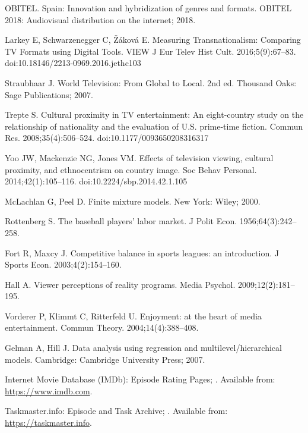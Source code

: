\documentclass[10pt,letterpaper]{article}
\begin{document}
\begin{thebibliography}{22}
OBITEL.
\newblock Spain: Innovation and hybridization of genres and formats.
\newblock OBITEL 2018: Audiovisual distribution on the internet; 2018.

Larkey E, Schwarzenegger C, Žáková E.
\newblock Measuring Transnationalism: Comparing TV Formats using Digital Tools.
\newblock VIEW J Eur Telev Hist Cult. 2016;5(9):67--83.
\newblock doi:10.18146/2213-0969.2016.jethc103

Straubhaar J.
\newblock World Television: From Global to Local.
\newblock 2nd ed. Thousand Oaks: Sage Publications; 2007.

Trepte S.
\newblock Cultural proximity in TV entertainment: An eight-country study on the relationship of nationality and the evaluation of U.S. prime-time fiction.
\newblock Commun Res. 2008;35(4):506--524.
\newblock doi:10.1177/0093650208316317

Yoo JW, Mackenzie NG, Jones VM.
\newblock Effects of television viewing, cultural proximity, and ethnocentrism on country image.
\newblock Soc Behav Personal. 2014;42(1):105--116.
\newblock doi:10.2224/sbp.2014.42.1.105

McLachlan G, Peel D.
\newblock Finite mixture models.
\newblock New York: Wiley; 2000.

Rottenberg S.
\newblock The baseball players’ labor market.
\newblock J Polit Econ. 1956;64(3):242--258.

Fort R, Maxcy J.
\newblock Competitive balance in sports leagues: an introduction.
\newblock J Sports Econ. 2003;4(2):154--160.

Hall A.
\newblock Viewer perceptions of reality programs.
\newblock Media Psychol. 2009;12(2):181--195.

Vorderer P, Klimmt C, Ritterfeld U.
\newblock Enjoyment: at the heart of media entertainment.
\newblock Commun Theory. 2004;14(4):388--408.

Gelman A, Hill J.
\newblock Data analysis using regression and multilevel/hierarchical models.
\newblock Cambridge: Cambridge University Press; 2007.

Internet Movie Database (IMDb): Episode Rating Pages;
. Available from: \url{https://www.imdb.com}.

Taskmaster.info: Episode and Task Archive;
. Available from: \url{https://taskmaster.info}.


\end{thebibliography}
\end{document}
